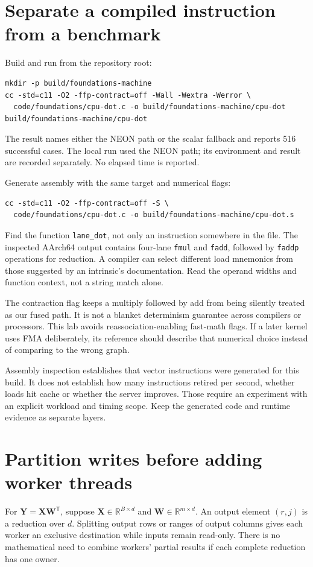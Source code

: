 \section{Separate a compiled instruction from a benchmark}
Build and run from the repository root:
\begin{verbatim}
mkdir -p build/foundations-machine
cc -std=c11 -O2 -ffp-contract=off -Wall -Wextra -Werror \
  code/foundations/cpu-dot.c -o build/foundations-machine/cpu-dot
build/foundations-machine/cpu-dot
\end{verbatim}
The result names either the NEON path or the scalar fallback
and reports 516 successful cases. The local run used the NEON
path; its environment and result are recorded separately.
No elapsed time is reported.

Generate assembly with the same target and numerical flags:
\begin{verbatim}
cc -std=c11 -O2 -ffp-contract=off -S \
  code/foundations/cpu-dot.c -o build/foundations-machine/cpu-dot.s
\end{verbatim}
Find the function \texttt{lane\_dot}, not only an instruction
somewhere in the file. The inspected AArch64 output contains
four-lane \texttt{fmul} and \texttt{fadd}, followed by
\texttt{faddp} operations for reduction. A compiler can select
different load mnemonics from those suggested by an intrinsic's
documentation. Read the operand widths and function context,
not a string match alone.

The contraction flag keeps a multiply followed by add from
being silently treated as our fused path. It is not a blanket
determinism guarantee across compilers or processors. This lab
avoids reassociation-enabling fast-math flags. If a later kernel
uses FMA deliberately, its reference should describe that
numerical choice instead of comparing to the wrong graph.

Assembly inspection establishes that vector instructions were
generated for this build. It does not establish how many
instructions retired per second, whether loads hit cache or
whether the server improves. Those require an experiment with
an explicit workload and timing scope. Keep the generated
code and runtime evidence as separate layers.

\section{Partition writes before adding worker threads}
For $\mathbf{Y}=\mathbf{X}\mathbf{W}^{\mathsf T}$, suppose
$\mathbf{X}\in\mathbb{R}^{B\times d}$ and
$\mathbf{W}\in\mathbb{R}^{m\times d}$. An output element
$(r,j)$ is a reduction over $d$. Splitting output rows
or ranges of output columns gives each worker an exclusive
destination while inputs remain read-only. There is no
mathematical need to combine workers' partial results if
each complete reduction has one owner.

